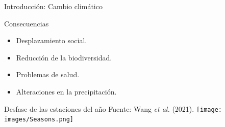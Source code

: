 \documentclass[aspectratio=169]{beamer}
\begin{document}
\begin{frame}{Introducción: Cambio climático}
\vspace{-1cm}

\begin{block}{\centering Consecuencias}
       \begin{minipage}{0.5\textwidth}
			\begin{itemize}
				\item Desplazamiento social.
                \item Reducción de la biodiversidad.
			\end{itemize}
		\end{minipage}%
		\begin{minipage}{0.5\textwidth}
			\begin{itemize}
				\item Problemas de salud.
                \item Alteraciones en la precipitación.
			\end{itemize}
		\end{minipage}
    \end{block}
    \pause
    \begin{block}{Desfase de las estaciones del año \hfill {\scriptsize Fuente: Wang \textit{et al.} (2021).}}
    \centering
        \texttt{[image: images/Seasons.png]}
    \end{block}
\end{frame}
\end{document}
